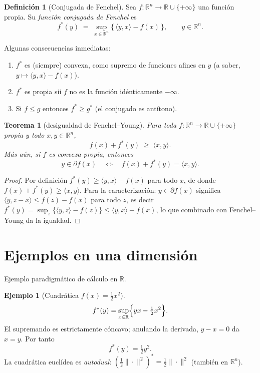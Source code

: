 \documentclass[12pt]{book}
\newcommand{\R}{\mathbb{R}}
\newcommand{\subdiff}{\partial}
\theoremstyle{definition}
\newtheorem{definicion}{Definición}[section]
\newtheorem{ejemplo}{Ejemplo}[section]
\theoremstyle{plain}
\newtheorem{teorema}{Teorema}[section]
\theoremstyle{remark}
\begin{document}
\begin{definicion}[Conjugada de Fenchel]
  Sea $f:\R^n\to\R\cup\{+\infty\}$ una función propia.  Su
  \emph{función conjugada de Fenchel} es
  \[
    \boxed{\;
    f^*(y) \;=\; \sup_{x\in\R^n}\bigl\{\,\langle y,x\rangle - f(x)\,\bigr\},
    \qquad y\in\R^n.
    \;}
  \]
\end{definicion}

Algunas consecuencias inmediatas:
\begin{enumerate}[leftmargin=1.4em,itemsep=2pt]
  \item $f^*$ es (siempre) convexa, como supremo de funciones
        afines en $y$ (a saber, $y\mapsto \langle y,x\rangle - f(x)$).
  \item $f^*$ es propia sii $f$ no es la función idénticamente $-\infty$.
  \item Si $f\le g$ entonces $f^*\ge g^*$ (el conjugado es
        antítono).
\end{enumerate}

\begin{teorema}[desigualdad de Fenchel--Young]
  Para toda $f:\R^n\to\R\cup\{+\infty\}$ propia y todo
  $x,y\in\R^n$,
  \[
    \boxed{\; f(x) + f^*(y) \;\ge\; \langle x,y\rangle. \;}
  \]
  Más aún, si $f$ es convexa propia, entonces
  \[
    y\in\subdiff f(x)
    \quad\Longleftrightarrow\quad
    f(x)+f^*(y)=\langle x,y\rangle.
  \]
\end{teorema}

\begin{proof}
  Por definición $f^*(y)\ge \langle y,x\rangle - f(x)$ para todo
  $x$, de donde $f(x)+f^*(y)\ge\langle x,y\rangle$.  Para la
  caracterización: $y\in\subdiff f(x)$ significa
  $\langle y,z-x\rangle \le f(z)-f(x)$ para todo $z$, es decir
  $f^*(y)=\sup_z\{\langle y,z\rangle-f(z)\}\le \langle y,x\rangle-f(x)$,
  lo que combinado con Fenchel--Young da la igualdad. \end{proof}

\section{Ejemplos en una dimensión}\label{sec:ejemplos}

Ejemplo paradigmático de cálculo en $\R$.

\begin{ejemplo}[Cuadrática $f(x)=\tfrac12 x^2$]
  \[
    f^*(y)=\sup_{x\in\R}\Bigl\{ yx - \tfrac12 x^2 \Bigr\}.
  \]
  El supremando es estrictamente cóncavo; anulando la derivada,
  $y-x=0$ da $x=y$.  Por tanto
  \[
    f^*(y)=\tfrac12 y^2.
  \]
  La cuadrática euclídea es \emph{autodual}: $(\tfrac12\|\cdot\|^2)^*
  = \tfrac12\|\cdot\|^2$ (también en $\R^n$).
\end{ejemplo}
\end{document}
